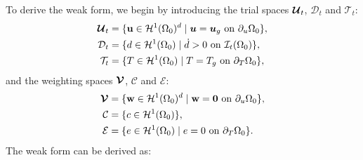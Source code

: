 To derive the weak form, we begin by introducing the trial spaces $\boldsymbol{\mathcal{U}}_t$, $\mathcal{D}_t$ and $\mathcal{T}_t$:
\begin{subequations}
  \begin{align}
    \boldsymbol{\mathcal{U}}_t & = \{ \textbf{u} \in \mathcal{H}^1(\Omega_0)^d \mid \boldsymbol{u} = \boldsymbol{u}_g \text{ on } \partial_u\Omega_0 \}, \\
    \mathcal{D}_t      & = \{ d \in \mathcal{H}^1(\Omega_0) \mid \dot{d} > 0 \text{ on } \mathcal{I}_t(\Omega_0) \},   \\
    \mathcal{T}_t      & = \{ T \in \mathcal{H}^1(\Omega_0) \mid T = T_g \text{ on } \partial_T\Omega_0 \},            
  \end{align}
\end{subequations}
and the weighting spaces $\boldsymbol{\mathcal{V}}$, $\mathcal{C}$ and $\mathcal{E}$:
\begin{subequations}
  \begin{align}
    \boldsymbol{\mathcal{V}} & = \{ \textbf{w} \in \mathcal{H}^1(\Omega_0)^d \mid \textbf{w} = \boldsymbol{0} \text{ on } \partial_u\Omega_0 \}, \\
    \mathcal{C}      & = \{ c \in \mathcal{H}^1(\Omega_0) \},                                                       \\
    \mathcal{E}      & = \{ e \in \mathcal{H}^1(\Omega_0) \mid e = 0 \text{ on } \partial_T\Omega_0 \}.              
  \end{align}
\end{subequations}
The weak form can be derived as:
